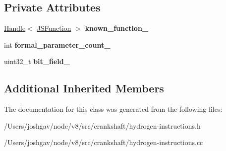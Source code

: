 \subsection*{Private Attributes}
\begin{DoxyCompactItemize}
\item 
\hyperlink{classv8_1_1internal_1_1_handle}{Handle}$<$ \hyperlink{classv8_1_1internal_1_1_j_s_function}{J\+S\+Function} $>$ {\bfseries known\+\_\+function\+\_\+}\hypertarget{classv8_1_1internal_1_1_h_invoke_function_a50574c496327324e0e226e025f6da553}{}\label{classv8_1_1internal_1_1_h_invoke_function_a50574c496327324e0e226e025f6da553}

\item 
int {\bfseries formal\+\_\+parameter\+\_\+count\+\_\+}\hypertarget{classv8_1_1internal_1_1_h_invoke_function_ab2a201f83805f8da250201a3756191eb}{}\label{classv8_1_1internal_1_1_h_invoke_function_ab2a201f83805f8da250201a3756191eb}

\item 
uint32\+\_\+t {\bfseries bit\+\_\+field\+\_\+}\hypertarget{classv8_1_1internal_1_1_h_invoke_function_a9a2778a8dc322ea190f77d3577d5a177}{}\label{classv8_1_1internal_1_1_h_invoke_function_a9a2778a8dc322ea190f77d3577d5a177}

\end{DoxyCompactItemize}
\subsection*{Additional Inherited Members}


The documentation for this class was generated from the following files\+:\begin{DoxyCompactItemize}
\item 
/\+Users/joshgav/node/v8/src/crankshaft/hydrogen-\/instructions.\+h\item 
/\+Users/joshgav/node/v8/src/crankshaft/hydrogen-\/instructions.\+cc\end{DoxyCompactItemize}
